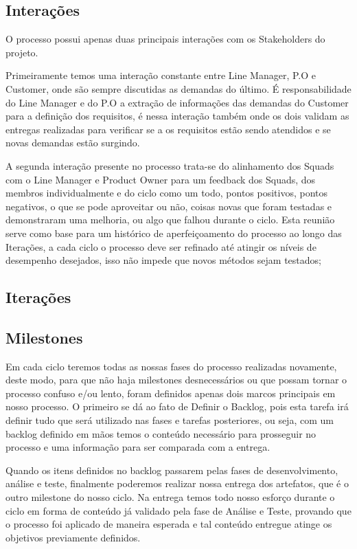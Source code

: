 \documentclass[	DIV=calc,%
							paper=a4,%
							fontsize=12pt,%
							onecolumn]{scrartcl}	 					%
\begin{document}
\subsection{Interações}
O processo possui apenas duas principais interações com os Stakeholders do projeto. 

Primeiramente temos uma interação constante entre Line Manager, P.O e Customer, onde são sempre discutidas as demandas do último. É responsabilidade do Line Manager e do P.O a extração de informações das demandas do Customer para a definição dos requisitos, é nessa interação também onde os dois validam as entregas realizadas para verificar se a os requisitos estão sendo atendidos e se novas demandas estão surgindo. 

A segunda interação presente no processo trata-se do alinhamento dos Squads com o Line Manager e Product Owner para um feedback dos Squads, dos membros individualmente e do ciclo como um todo, pontos positivos, pontos negativos, o que se pode aproveitar ou não, coisas novas que foram testadas e demonstraram uma melhoria, ou algo que falhou durante o ciclo. Esta reunião serve como base para um histórico de aperfeiçoamento do processo ao longo das Iterações, a cada ciclo o processo deve ser refinado até atingir os níveis de desempenho desejados, isso não impede que novos métodos sejam testados; 
\subsection{Iterações}

\subsection{Milestones}
Em cada ciclo teremos todas as nossas fases do processo realizadas novamente, deste modo, para que não haja milestones desnecessários ou que possam tornar o processo confuso e/ou lento, foram definidos apenas dois marcos principais em nosso processo. O primeiro se dá ao fato de Definir o Backlog, pois esta tarefa irá definir tudo que será utilizado nas fases e tarefas posteriores, ou seja, com um backlog definido em mãos temos o conteúdo necessário para prosseguir no processo e uma informação para ser comparada com a entrega. 

Quando os itens definidos no backlog passarem pelas fases de desenvolvimento, análise e teste, finalmente poderemos realizar nossa entrega dos artefatos, que é o outro milestone do nosso ciclo. Na entrega temos todo nosso esforço durante o ciclo em forma de conteúdo já validado pela fase de Análise e Teste, provando que o processo foi aplicado de maneira esperada e tal conteúdo entregue atinge os objetivos previamente definidos.
\end{document}
